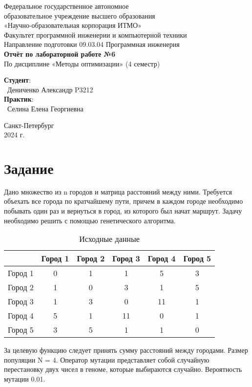 \documentclass{article}
\begin{document}
\begin{center}
    \Large
    Федеральное государственное автономное \\
    образовательное учреждение высшего образования \\ 
    «Научно-образовательная корпорация ИТМО»\\
    \vspace{0.5cm}
    \large
    Факультет программной инженерии и компьютерной техники \\
    Направление подготовки 09.03.04 Программная инженерия \\
    \vspace{1cm}
    \Large
    \textbf{Отчёт по лабораторной работе №6} \\
    По дисциплине «Методы оптимизации» (4 семестр)\\
    \large
    \vspace{8cm}

    \begin{minipage}{.33\textwidth}
    \end{minipage}
    \hfill
    \begin{minipage}{.4\textwidth}
    
        \textbf{Студент}: \vspace{.1cm} \\
        \ Дениченко Александр P3212\\
        \textbf{Практик}:  \\
        \ Селина Елена Георгиевна
    \end{minipage}
    \vfill
Санкт-Петербург\\ 2024 г.
\end{center}
\pagestyle{empty}
\newpage
\pagestyle{plain}


\section*{Задание }
Дано множество из n городов и матрица расстояний между ними. Требуется объехать
все города по кратчайшему пути, причем в каждом городе необходимо побывать один
раз и вернуться в город, из которого был начат маршрут. Задачу необходимо решить с
помощью генетического алгоритма.

\begin{table}[H]
    \centering
    \caption{Исходные данные}
    \begin{tabular}{|c|c|c|c|c|c|}
    \hline
        &Город 1&Город 2&Город 3&Город 4&Город 5\\
        \hline
        Город 1&0&1&1&5&3\\
        Город 2&1&0&3&1&5\\
        Город 3&1&3&0&11&1\\
        Город 4&5&1&11&0&1\\
        Город 5&3&5&1&1&0\\
        \hline
    \end{tabular}
\end{table}
За целевую функцию следует принять сумму расстояний между городами.
Размер популяции N = 4.
Оператор мутации представляет собой случайную перестановку двух чисел в геноме,
которые выбираются случайно. Вероятность мутации 0.01.
\end{document}
